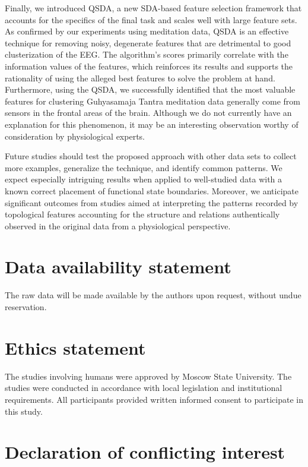 \documentclass[10pt]{iopart}
\begin{document}
Finally, we introduced QSDA, a new SDA-based feature selection framework that accounts for the specifics of the final task and scales well with large feature sets. As confirmed by our experiments using meditation data, QSDA is an effective technique for removing noisy, degenerate features that are detrimental to good clusterization of the EEG. The algorithm's scores primarily correlate with the information values of the features, which reinforces its results and supports the rationality of using the alleged best features to solve the problem at hand. Furthermore, using the QSDA, we successfully identified that the most valuable features for clustering Guhyasamaja Tantra meditation data generally come from sensors in the frontal areas of the brain. Although we do not currently have an explanation for this phenomenon, it may be an interesting observation worthy of consideration by physiological experts.

Future studies should test the proposed approach with other data sets to collect more examples, generalize the technique, and identify common patterns. We expect especially intriguing results when applied to well-studied data with a known correct placement of functional state boundaries. Moreover, we anticipate significant outcomes from studies aimed at interpreting the patterns recorded by topological features accounting for the structure and relations authentically observed in the original data from a physiological perspective.

\section*{Data availability statement}

The raw data will be made available by the authors upon request, without undue reservation.

\section*{Ethics statement}

The studies involving humans were approved by Moscow State University. The studies were conducted in accordance with local legislation and institutional requirements. All participants provided written informed consent to participate in this study.

\section*{Declaration of conflicting interest}
\end{document}
